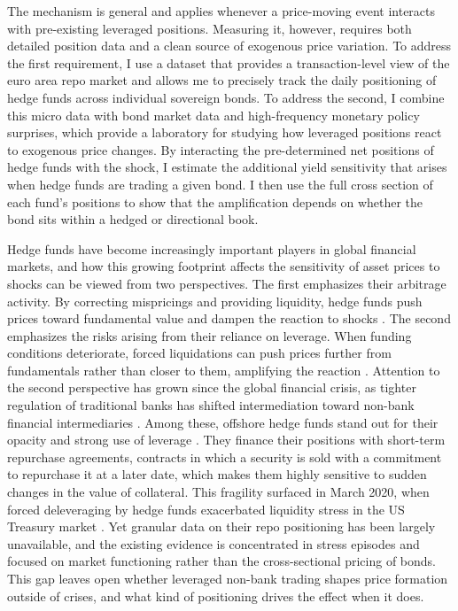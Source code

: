 \documentclass[english, 11pt, oneside]{article}
\begin{document}
The mechanism is general and applies whenever a price-moving event interacts with pre-existing leveraged positions. Measuring it, however, requires both detailed position data and a clean source of exogenous price variation. To address the first requirement, I use a dataset that provides a transaction-level view of the euro area repo market and allows me to precisely track the daily positioning of hedge funds across individual sovereign bonds. To address the second, I combine this micro data with bond market data and high-frequency monetary policy surprises, which provide a laboratory for studying how leveraged positions react to exogenous price changes. By interacting the pre-determined net positions of hedge funds with the shock, I estimate the additional yield sensitivity that arises when hedge funds are trading a given bond. I then use the full cross section of each fund's positions to show that the amplification depends on whether the bond sits within a hedged or directional book.

Hedge funds have become increasingly important players in global financial markets, and how this growing footprint affects the sensitivity of asset prices to shocks can be viewed from two perspectives. The first emphasizes their arbitrage activity. By correcting mispricings and providing liquidity, hedge funds push prices toward fundamental value and dampen the reaction to shocks \citep{gromb2002, cao2018}. The second emphasizes the risks arising from their reliance on leverage. When funding conditions deteriorate, forced liquidations can push prices further from fundamentals rather than closer to them, amplifying the reaction \citep{shleifer1997, brunnermeier2009, geanakoplos2010}. Attention to the second perspective has grown since the global financial crisis, as tighter regulation of traditional banks has shifted intermediation toward non-bank financial intermediaries \citep{pelizzon2025nbfi}. Among these, offshore hedge funds stand out for their opacity and strong use of leverage \citep{barth2025cross}. They finance their positions with short-term repurchase agreements, contracts in which a security is sold with a commitment to repurchase it at a later date, which makes them highly sensitive to sudden changes in the value of collateral. This fragility surfaced in March 2020, when forced deleveraging by hedge funds exacerbated liquidity stress in the US Treasury market \citep{barth2025, kruttli2025, aramonte2023}. Yet granular data on their repo positioning has been largely unavailable, and the existing evidence is concentrated in stress episodes and focused on market functioning rather than the cross-sectional pricing of bonds. This gap leaves open whether leveraged non-bank trading shapes price formation outside of crises, and what kind of positioning drives the effect when it does.
\end{document}
